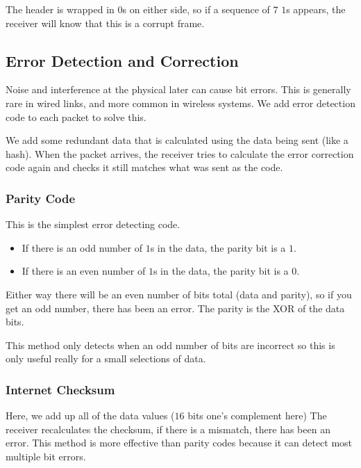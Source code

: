 The header is wrapped in \(0\)s on either side, so if a sequence of \(7\) \(1\)s appears, the receiver will know that this is a corrupt frame.

\subsection{Error Detection and Correction}\label{sub:error_detection_and_correction}

Noise and interference at the physical later can cause bit errors.
This is generally rare in wired links, and more common in wireless systems.
We add error detection code to each packet to solve this.

We add some redundant data that is calculated using the data being sent (like a hash).
When the packet arrives, the receiver tries to calculate the error correction code again and checks it still matches what was sent as the code.

\subsubsection{Parity Code}\label{ssub:parity_code}

This is the simplest error detecting code.
\begin{itemize}
	\item If there is an odd number of \(1\)s in the data, the parity bit is a \(1\).
	\item If there is an even number of \(1\)s in the data, the parity bit is a \(0\).
\end{itemize}
Either way there will be an even number of bits total (data and parity), so if you get an odd number, there has been an error.
The parity is the XOR of the data bits.

\begin{note}
	This method only detects when an odd number of bits are incorrect so this is only useful really for a small selections of data.
\end{note}

\subsubsection{Internet Checksum}\label{ssub:internet_checksum}

Here, we add up all of the data values (\(16\) bits one's complement here)
The receiver recalculates the checksum, if there is a mismatch, there has been an error.
This method is more effective than parity codes because it can detect most multiple bit errors.

